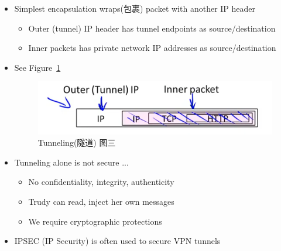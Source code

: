 \documentclass[12pt]{ctexart}   %
\begin{document}
\begin{itemize}
		\item Simplest encapsulation wraps(包裹) packet with another IP header
		\begin{itemize}
			\item Outer (tunnel) IP header has tunnel endpoints as source/destination
			\item Inner packets has private network IP addresses as source/destination
		\end{itemize}
		\item See Figure~\ref{fig:10-8-6}
		  
		\begin{figure}[h!] %
		\centering
		\includegraphics[scale=0.7]{images/10-8-6}
		\caption{Tunneling(隧道) 图三}
		\label{fig:10-8-6}
		\end{figure}

		\item Tunneling alone is not secure ... 
		\begin{itemize}
			\item No confidentiality, integrity, authenticity
			\item Trudy can read, inject her own messages
			\item We require cryptographic protections
		\end{itemize}

		\item IPSEC (IP Security) is often used to secure VPN tunnels
	\end{itemize}
\end{document}
